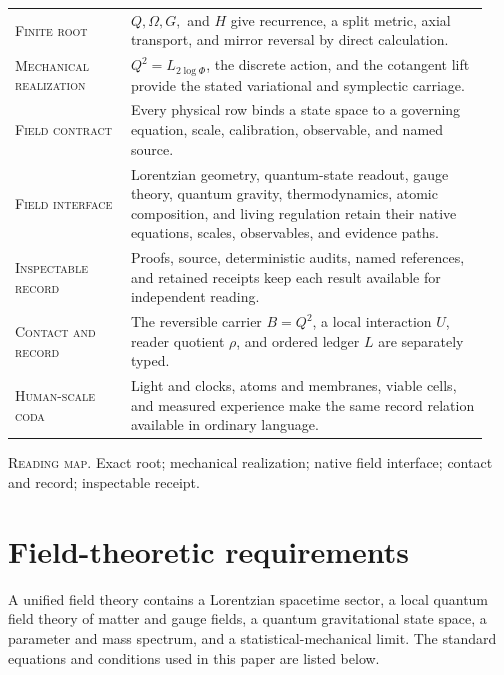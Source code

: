 \vspace{1.2em}
\begin{center}
\begin{minipage}{0.90\textwidth}
\small
\renewcommand{\arraystretch}{1.15}
\begin{tabular}{@{}L{0.23\linewidth}L{0.71\linewidth}@{}}
\toprule
\textsc{Finite root} & $Q,\Omega,G,$ and $H$ give recurrence, a split metric, axial transport, and mirror reversal by direct calculation.\\
\addlinespace
\textsc{Mechanical realization} & $Q^2=L_{2\log\Phi}$, the discrete action, and the cotangent lift provide the stated variational and symplectic carriage.\\
\addlinespace
\textsc{Field contract} & Every physical row binds a state space to a governing equation, scale, calibration, observable, and named source.\\
\addlinespace
\textsc{Field interface} & Lorentzian geometry, quantum-state readout, gauge theory, quantum gravity, thermodynamics, atomic composition, and living regulation retain their native equations, scales, observables, and evidence paths.\\
\addlinespace
\textsc{Inspectable record} & Proofs, source, deterministic audits, named references, and retained receipts keep each result available for independent reading.\\
\addlinespace
\textsc{Contact and record} & The reversible carrier $B=Q^2$, a local interaction $U$, reader quotient $\rho$, and ordered ledger $L$ are separately typed.\\
\addlinespace
\textsc{Human-scale coda} & Light and clocks, atoms and membranes, viable cells, and measured experience make the same record relation available in ordinary language.\\
\bottomrule
\end{tabular}
\par\smallskip
\centering\textsc{Reading map.} Exact root; mechanical realization; native field interface; contact and record; inspectable receipt.
\end{minipage}
\end{center}

\section{Field-theoretic requirements}

A unified field theory contains a Lorentzian spacetime sector, a local quantum
field theory of matter and gauge fields, a quantum gravitational state space,
a parameter and mass spectrum, and a statistical-mechanical limit.  The
standard equations and conditions used in this paper are listed below.

